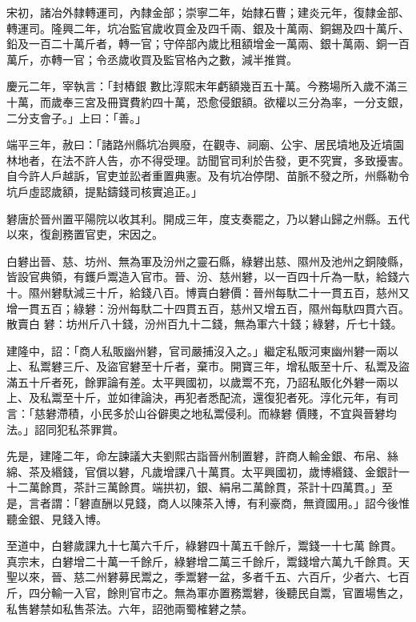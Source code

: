 \begin{pinyinscope}
 宋初，諸冶外隸轉運司，內隸金部；崇寧二年，始隸石曹；建炎元年，復隸金部、轉運司。隆興二年，坑冶監官歲收買金及四千兩、銀及十萬兩、銅錫及四十萬斤、鉛及一百二十萬斤者，轉一官；守倅部內歲比租額增金一萬兩、銀十萬兩、銅一百萬斤，亦轉一官；令丞歲收買及監官格內之數，減半推賞。



 慶元二年，宰執言：「封樁銀
 數比淳熙末年虧額幾百五十萬。今務場所入歲不滿三十萬，而歲奉三宮及冊寶費約四十萬，恐愈侵銀額。欲權以三分為率，一分支銀，二分支會子。」上曰：「善。」



 端平三年，赦曰：「諸路州縣坑冶興廢，在觀寺、祠廟、公宇、居民墳地及近墳園林地者，在法不許人告，亦不得受理。訪聞官司利於告發，更不究實，多致擾害。自今許人戶越訴，官吏並訟者重置典憲。及有坑冶停閉、苗脈不發之所，州縣勒令坑戶虛認歲額，提點鑄錢司核實追正。」



 礬唐於晉州置平陽院以收其利。開成三年，度支奏罷之，乃以礬山歸之州縣。五代以來，復創務置官吏，宋因之。



 白礬出晉、慈、坊州、無為軍及汾州之靈石縣，綠礬出慈、隰州及池州之銅陵縣，皆設官典領，有鑊戶鬻造入官市。晉、汾、慈州礬，以一百四十斤為一馱，給錢六十。隰州礬馱減三十斤，給錢八百。博賣白礬價：晉州每馱二十一貫五百，慈州又增一貫五百；綠礬：汾州每馱二十四貫五百，慈州又增五百，隰州每馱四貫六百。散賣白
 礬：坊州斤八十錢，汾州百九十二錢，無為軍六十錢；綠礬，斤七十錢。



 建隆中，詔：「商人私販幽州礬，官司嚴捕沒入之。」繼定私販河東幽州礬一兩以上、私鬻礬三斤、及盜官礬至十斤者，棄市。開寶三年，增私販至十斤、私鬻及盜滿五十斤者死，餘罪論有差。太平興國初，以歲鬻不充，乃詔私販化外礬一兩以上、及私鬻至十斤，並如律論決，再犯者悉配流，還復犯者死。淳化元年，有司言：「慈礬滯積，小民多於山谷僻奧之地私鬻侵利。而綠礬
 價賤，不宜與晉礬均法。」詔同犯私茶罪賞。



 先是，建隆二年，命左諫議大夫劉熙古詣晉州制置礬，許商人輸金銀、布帛、絲綿、茶及緡錢，官償以礬，凡歲增課八十萬貫。太平興國初，歲博緡錢、金銀計一十二萬餘貫，茶計三萬餘貫。端拱初，銀、絹帛二萬餘貫，茶計十四萬貫。」至是，言者謂：「礬直酬以見錢，商人以陳茶入博，有利豪商，無資國用。」詔今後惟聽金銀、見錢入博。



 至道中，白礬歲課九十七萬六千斤，綠礬四十萬五千餘斤，鬻錢一十七萬
 餘貫。真宗末，白礬增二十萬一千餘斤，綠礬增二萬三千餘斤，鬻錢增六萬九千餘貫。天聖以來，晉、慈二州礬募民鬻之，季鬻礬一盆，多者千五、六百斤，少者六、七百斤，四分輸一入官，餘則官市之。無為軍亦置務鬻礬，後聽民自鬻，官置場售之，私售礬禁如私售茶法。六年，詔弛兩蜀榷礬之禁。




\end{pinyinscope}
